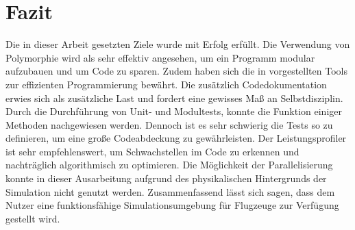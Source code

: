 \section{Fazit}
Die in dieser Arbeit gesetzten Ziele wurde mit Erfolg erfüllt. Die Verwendung von Polymorphie wird als sehr effektiv angesehen, um ein Programm modular aufzubauen und um Code zu sparen. Zudem haben sich die in \cite{Kessler.Sommersemester2017} vorgestellten Tools zur effizienten Programmierung bewährt. Die zusätzlich Codedokumentation erwies sich als zusätzliche Last und fordert eine gewisses Maß an Selbstdisziplin. Durch die Durchführung von Unit- und Modultests, konnte die Funktion einiger Methoden nachgewiesen werden. Dennoch ist es sehr schwierig die Tests so zu definieren, um eine große Codeabdeckung zu gewährleisten. Der Leistungsprofiler ist sehr empfehlenswert, um Schwachstellen im Code zu erkennen und nachträglich algorithmisch zu optimieren. Die Möglichkeit der Parallelisierung konnte in dieser Ausarbeitung aufgrund des physikalischen Hintergrunds der Simulation nicht genutzt werden. Zusammenfassend lässt sich sagen, dass dem Nutzer eine funktionsfähige Simulationsumgebung für Flugzeuge zur Verfügung gestellt wird. 


